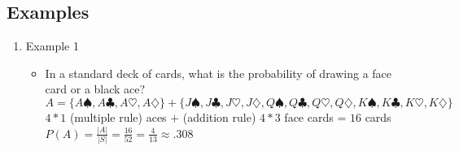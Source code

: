 \documentclass[12pt]{article}
\begin{document}
        \subsection{Examples}
            \begin{enumerate}
                \item Example 1
                \begin{itemize}
                    \item In a standard deck of cards, what is the probability of drawing a face card or a black ace?
                    \\$A = \{A\spadesuit, A\clubsuit, A\heartsuit, A\diamondsuit\} + \{J\spadesuit, J\clubsuit, J\heartsuit, J\diamondsuit, Q\spadesuit, Q\clubsuit, Q\heartsuit, Q\diamondsuit, K\spadesuit, K\clubsuit, K\heartsuit, K\diamondsuit\}$
                    \\$4 * 1$ (multiple rule) aces $+$ (addition rule) $4 * 3$ face cards = $16$ cards
                    \\$P(A) = \frac{|A|}{|S|} = \frac{16}{52} = \frac{4}{13} \approx .308$
                \end{itemize}
            \end{enumerate}
\end{document}
